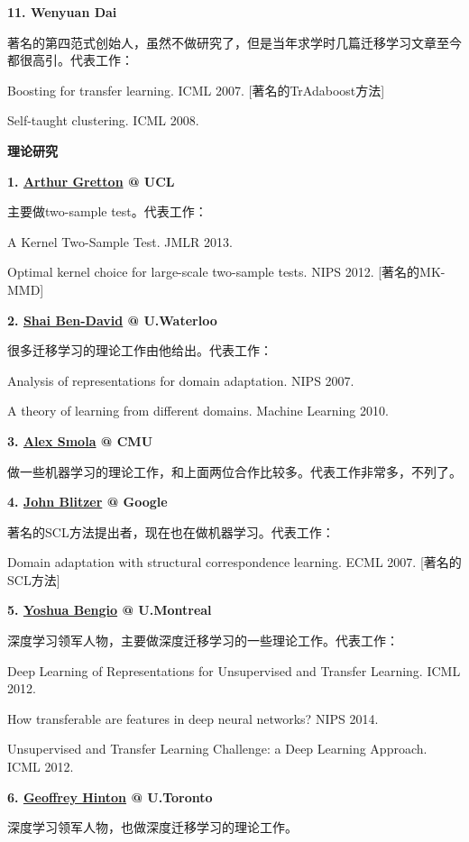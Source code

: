 \textbf{11. Wenyuan Dai}

著名的第四范式创始人，虽然不做研究了，但是当年求学时几篇迁移学习文章至今都很高引。代表工作：

Boosting for transfer learning. ICML 2007. [著名的TrAdaboost方法]

Self-taught clustering. ICML 2008.


\textbf{理论研究}

\textbf{1. \href{http://www.gatsby.ucl.ac.uk/~gretton/}{Arthur Gretton} @ UCL}

主要做two-sample test。代表工作：

A Kernel Two-Sample Test. JMLR 2013.

Optimal kernel choice for large-scale two-sample tests. NIPS 2012. [著名的MK-MMD]


\textbf{2. \href{https://cs.uwaterloo.ca/~shai/}{Shai Ben-David} @ U.Waterloo}

很多迁移学习的理论工作由他给出。代表工作：

Analysis of representations for domain adaptation. NIPS 2007.

A theory of learning from different domains. Machine Learning 2010.


\textbf{3. \href{https://alex.smola.org/}{Alex Smola} @ CMU}

做一些机器学习的理论工作，和上面两位合作比较多。代表工作非常多，不列了。

\textbf{4. \href{https://alex.smola.org/}{John Blitzer} @ Google}

著名的SCL方法提出者，现在也在做机器学习。代表工作：

Domain adaptation with structural correspondence learning. ECML 2007. [著名的SCL方法]


\textbf{5. \href{http://www.iro.umontreal.ca/~bengioy/yoshua_en/index.html}{Yoshua Bengio} @ U.Montreal}

深度学习领军人物，主要做深度迁移学习的一些理论工作。代表工作：

Deep Learning of Representations for Unsupervised and Transfer Learning. ICML 2012.

How transferable are features in deep neural networks? NIPS 2014.

Unsupervised and Transfer Learning Challenge: a Deep Learning Approach. ICML 2012.


\textbf{6. \href{http://www.iro.umontreal.ca/~bengioy/yoshua_en/index.html}{Geoffrey Hinton} @ U.Toronto}

深度学习领军人物，也做深度迁移学习的理论工作。

